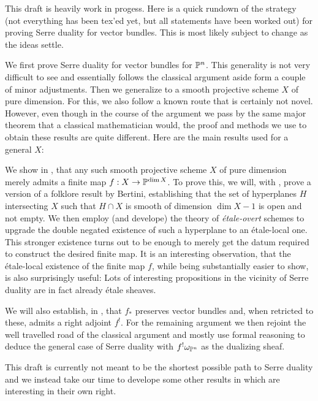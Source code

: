 This draft is heavily work in progess.
Here is a quick rundown of the strategy (not everything has been tex'ed yet, but all statements have been worked out) for proving Serre duality for vector bundles.
This is most likely subject to change as the ideas settle.

We first prove Serre duality for vector bundles for $\mathbb{P}^n$.
This generality is not very difficult to see and essentially follows the classical argument aside form a couple of minor adjustments.
Then we generalize to a smooth projective scheme $X$ of pure dimension.
For this, we also follow a known route that is certainly not novel.
However, even though in the course of the argument we pass by the same major theorem that a classical mathematician would, the proof and methods we use to obtain these results are quite different.
Here are the main results used for a general $X$:

We show in , that any such smooth projective scheme $X$ of pure dimension merely admits a finite map $f : X \to \mathbb{P}^{\dim X}$.
To prove this, we will, with , prove a version of a folklore result by Bertini, establishing that the set of hyperplanes $H$ intersecting $X$ such that $H \cap X$ is smooth of dimension $\dim X - 1$ is open and not empty.
We then employ (and develope) the theory of \emph{étale-overt} schemes to upgrade the double negated existence of such a hyperplane to an étale-local one.
This stronger existence turns out to be enough to merely get the datum required to construct the desired finite map.
It is an interesting observation, that the étale-local existence of the finite map $f$, while being substantially easier to show, is also surprisingly useful: Lots of interesting propositions in the vicinity of Serre duality are in fact already étale sheaves.

We will also establish, in , that $f_\ast$ preserves vector bundles and, when retricted to these, admits a right adjoint $f^!$.
For the remaining argument we then rejoint the well travelled road of the classical argument and mostly use formal reasoning to deduce the general case of Serre duality with $f^!\omega_{\mathbb{P}^n}$ as the dualizing sheaf.
\bigskip

This draft is currently not meant to be the shortest possible path to Serre duality and we instead take our time to develope some other results in which are interesting in their own right.
\bigskip

